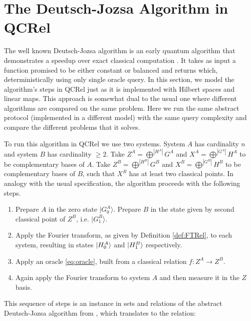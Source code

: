 \section{The Deutsch-Jozsa Algorithm in QCRel}

The well known Deutsch-Jozsa algorithm is an early quantum algorithm that demonstrates a speedup over exact classical computation \cite{DJAlg1992}. It takes as input a function promised to be either constant or balanced and returns which, deterministically using only single oracle query. In this section, we model the algorithm's steps in QCRel just as it is implemented with Hilbert spaces and linear maps. This approach is somewhat dual to the usual one where different algorithms are compared on the same problem. Here we run the same abstract protocol (implemented in a different model) with the same query complexity and compare the different problems that it solves.

To run this algorithm in QCRel we use two systems.  System $A$ has cardinality $n$ and system $B$ has cardinality $\ge 2$. Take $Z^A=\bigoplus^{|H^{A}|}G^A$ and $X^A=\bigoplus^{|G^{A}|}H^A$ to be complementary bases of $A$. Take $Z^B=\bigoplus^{|H^{B}|}G^B$ and $X^B=\bigoplus^{|G^{B}|}H^B$ to be complementary bases of $B$, such that $X^B$ has at least two classical points. In analogy with the usual specification, the algorithm proceeds with the following steps.
\begin{enumerate}
\item Prepare $A$ in the zero state $|G^{A}_0\rangle$. Prepare $B$ in the state given by second classical point of $Z^B$, i.e. $|G^B_1\rangle$.

\item Apply the Fourier transform, as given by Definition \ref{def:FTRel}, to each system, resulting in states $| H_0^A \rangle$ and $| H_1^B \rangle$ respectively.

\item Apply an oracle \eqref{eq:oracle}, built from a classical relation $f:Z^A\to Z^B$.

\item Again apply the Fourier transform to system $A$ and then measure it in the $Z$ basis.
\end{enumerate}

\noindent This sequence of steps is an instance in sets and relations of the abstract Deutsch-Jozsa algorithm from \cite{vicary-tqa}, which translates to the relation:


